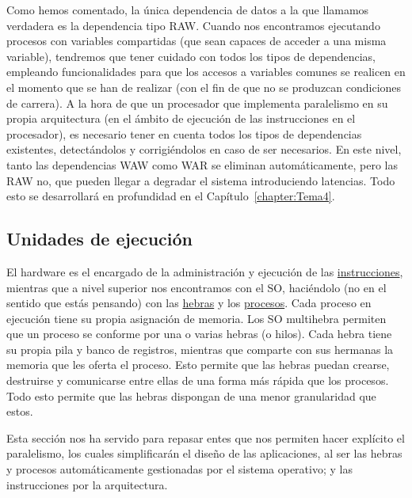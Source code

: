 Como hemos comentado, la única dependencia de datos a la que llamamos verdadera es la dependencia tipo RAW\@. Cuando nos encontramos ejecutando procesos con variables compartidas (que sean capaces de acceder a una misma variable), tendremos que tener cuidado con todos los tipos de dependencias, empleando funcionalidades para que los accesos a variables comunes se realicen en el momento que se han de realizar (con el fin de que no se produzcan condiciones de carrera). A la hora de que un procesador que implementa paralelismo en su propia arquitectura (en el ámbito de ejecución de las instrucciones en el procesador), es necesario tener en cuenta todos los tipos de dependencias existentes, detectándolos y corrigiéndolos en caso de ser necesarios. En este nivel, tanto las dependencias WAW como WAR se eliminan automáticamente, pero las RAW no, que pueden llegar a degradar el sistema introduciendo latencias. Todo esto se desarrollará en profundidad en el Capítulo~\ref{chapter:Tema4}.

\subsection{Unidades de ejecución}
El hardware es el encargado de la administración y ejecución de las \ul{instrucciones}, mientras que a nivel superior nos encontramos con el SO, haciéndolo (no en el sentido que estás pensando) con las \ul{hebras} y los \ul{procesos}. Cada proceso en ejecución tiene su propia asignación de memoria. Los SO multihebra permiten que un proceso se conforme por una o varias hebras (o hilos). Cada hebra tiene su propia pila y banco de registros, mientras que comparte con sus hermanas la memoria que les oferta el proceso. Esto permite que las hebras puedan crearse, destruirse y comunicarse entre ellas de una forma más rápida que los procesos. Todo esto permite que las hebras dispongan de una menor granularidad que estos. 

Esta sección nos ha servido para repasar entes que nos permiten hacer explícito el paralelismo, los cuales simplificarán el diseño de las aplicaciones, al ser las hebras y procesos automáticamente gestionadas por el sistema operativo; y las instrucciones por la arquitectura.

